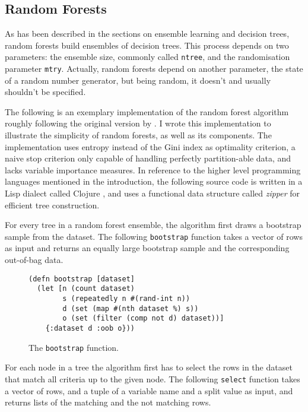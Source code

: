 \documentclass[a4paper,man,12pt,apacite,floatsintext,draftfirst]{apa6} %
\begin{document}
\subsection{Random Forests}
As has been described in the sections on ensemble learning and decision trees,
random forests build ensembles of decision trees.
This process depends on two parameters: the ensemble size, commonly called
\texttt{ntree}, and the randomisation parameter \texttt{mtry}.
Actually, random forests depend on another parameter,
the state of a random number generator, but being random,
it doesn't and usually shouldn't be specified.

The following is an exemplary implementation of the random forest algorithm
roughly following the original version by .
I wrote this implementation to illustrate the simplicity of random forests,
as well as its components.
The implementation uses entropy instead of the Gini index as
optimality criterion, a naive stop criterion only capable of handling
perfectly partition-able data, and lacks variable importance measures.
In reference to the higher level programming languages mentioned
in the introduction, the following source code is written in a Lisp
dialect called Clojure \cite{wpCLOJURE}, and uses a functional data structure
called \emph{zipper} \cite{huet1997zipper} for efficient tree construction.

For every tree in a random forest ensemble, the algorithm first draws a
bootstrap sample from the dataset.
The following \texttt{bootstrap} function takes a vector of rows as input
and returns an equally large bootstrap sample and the corresponding out-of-bag data.

\begin{figure}[H]
\caption{The \texttt{bootstrap} function.}
\begin{verbatim}
(defn bootstrap [dataset]
  (let [n (count dataset)
        s (repeatedly n #(rand-int n))
        d (set (map #(nth dataset %) s))
        o (set (filter (comp not d) dataset))]
    {:dataset d :oob o}))
\end{verbatim}
\end{figure}

For each node in a tree the algorithm first has to select the rows in the dataset
that match all criteria up to the given node.
The following \texttt{select} function takes a vector of rows, and a tuple of a variable name
and a split value as input, and returns lists of the matching and the not matching rows.
\end{document}
